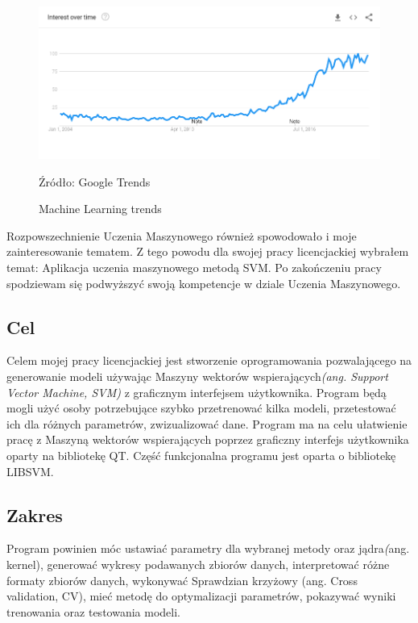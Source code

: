 \documentclass[paper=a4, fontsize=11pt]{scrartcl} %
\numberwithin{equation}{section} %
\numberwithin{figure}{section} %
\newcommand*{\captionsource}[2]{%
  \caption[{#1}]{%
      #1}
    Źródło: #2%
}
\begin{document}
    \begin{figure}[h]
        \begin{center}
            \includegraphics[scale=0.5]{./img/google-trends-ml.png}
            \captionsource{Machine Learning trends}{Google Trends}
            \label{fig:google-trends-ml}
        \end{center}
    \end{figure}

    \par Rozpowszechnienie Uczenia Maszynowego również spowodowało i moje zainteresowanie tematem.
    Z tego powodu dla swojej pracy licencjackiej wybrałem temat: Aplikacja uczenia maszynowego 
    metodą SVM.  Po zakończeniu pracy spodziewam się podwyższyć swoją kompetencje w dziale 
    Uczenia Maszynowego.

\subsection{Cel}
    \par Celem mojej pracy licencjackiej jest stworzenie oprogramowania pozwalającego na generowanie
    modeli używając Maszyny wektorów wspierających\textit{(ang. Support Vector Machine, SVM)} z graficznym 
    interfejsem użytkownika.  Program będą mogli użyć osoby potrzebujące szybko przetrenować kilka 
    modeli, przetestować ich dla różnych parametrów, zwizualizować dane. Program ma na celu ułatwienie
    pracę z Maszyną wektorów wspierających poprzez graficzny interfejs użytkownika
    oparty na bibliotekę QT. Część funkcjonalna programu jest oparta o bibliotekę LIBSVM\cite{CC01a}.

\subsection{Zakres}
    Program powinien móc ustawiać parametry dla wybranej metody oraz jądra\textit(ang. kernel), 
    generować wykresy podawanych zbiorów danych, interpretować różne formaty zbiorów danych, 
    wykonywać Sprawdzian krzyżowy (ang. Cross validation, CV), mieć metodę do optymalizacji 
    parametrów, pokazywać wyniki trenowania oraz testowania modeli.
\newpage
\end{document}

